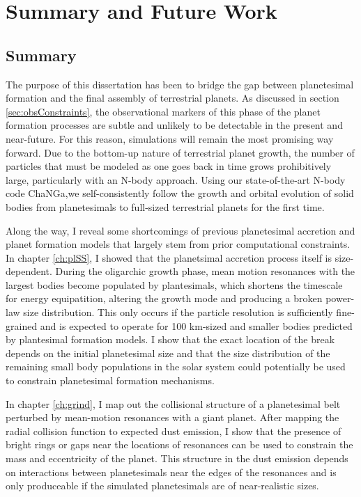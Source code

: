 \chapter {Summary and Future Work}

\section{Summary}
The purpose of this dissertation has been to bridge the gap between planetesimal formation and the final assembly of terrestrial planets. As discussed in section \ref{sec:obsConstraints}, the observational markers of this phase of the planet formation processes are subtle and unlikely to be detectable in the present and near-future. For this reason, simulations will remain the most promising way forward. Due to the bottom-up nature of terrestrial planet growth, the number of particles that must be modeled as one goes back in time grows prohibitively large, particularly with an N-body approach. Using our state-of-the-art N-body code {\sc ChaNGa},we self-consistently follow the growth and orbital evolution of solid bodies from planetesimals to full-sized terrestrial planets for the first time.

Along the way, I reveal some shortcomings of previous planetesimal accretion and planet formation models that largely stem from prior computational constraints. In chapter \ref{ch:plSS}, I showed that the planetsimal accretion process itself is size-dependent. During the oligarchic growth phase, mean motion resonances with the largest bodies become populated by plantesimals, which shortens the timescale for energy equipatition, altering the growth mode and producing a broken power-law size distribution. This only occurs if the particle resolution is sufficiently fine-grained and is expected to operate for 100 km-sized and smaller bodies predicted by plantesimal formation models. I show that the exact location of the break depends on the initial planetesimal size and that the size distribution of the remaining small body populations in the solar system could potentially be used to constrain planetesimal formation mechanisms.

In chapter \ref{ch:grind}, I map out the collisional structure of a planetesimal belt perturbed by mean-motion resonances with a giant planet. After mapping the radial collision function to expected dust emission, I show that the presence of bright rings or gaps near the locations of resonances can be used to constrain the mass and eccentricity of the planet. This structure in the dust emission depends on interactions between planetesimals near the edges of the resonances and is only produceable if the simulated planetesimals are of near-realistic sizes.

